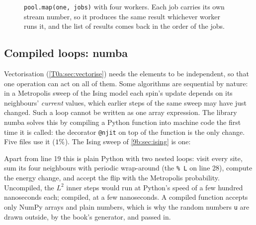 \begin{figure}[htbp]
\centering
{}
\caption{\texttt{pool.map(one, jobs)} with four workers. Each job carries its own stream number, so it produces the same result whichever worker runs it, and the list of results comes back in the order of the jobs.}
\label{T0a:fig:pool}
\end{figure}

\subsection{Compiled loops: numba}
\label{T0a:sec:numba}

Vectorisation (\cref{T0a:sec:vectorise}) needs the elements to be independent, so that one operation can act on all of them. Some algorithms are sequential by nature: in a Metropolis sweep of the Ising model each spin's update depends on its neighbours' \emph{current} values, which earlier steps of the same sweep may have just changed. Such a loop cannot be written as one array expression. The library numba solves this by compiling a Python function into machine code the first time it is called: the decorator \texttt{@njit} on top of the function is the only change. Five files use it ($1\%$). The Ising sweep of \cref{9b:sec:ising} is one:


Apart from line 19 this is plain Python with two nested loops: visit every site, sum its four neighbours with periodic wrap-around (the \texttt{\% L} on line 28), compute the energy change, and accept the flip with the Metropolis probability. Uncompiled, the $L^2$ inner steps would run at Python's speed of a few hundred nanoseconds each; compiled, at a few nanoseconds. A compiled function accepts only NumPy arrays and plain numbers, which is why the random numbers \texttt{u} are drawn outside, by the book's generator, and passed in.

